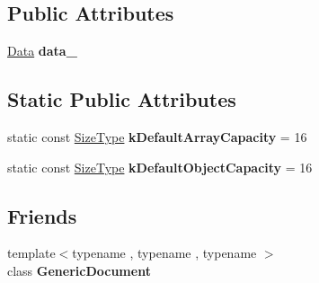 \subsection*{Public Attributes}
\begin{DoxyCompactItemize}
\item 
\mbox{\label{class_generic_value_aaf80f2c91d26fdde60b9edeeecd3509f}} 
\hyperlink{union_generic_value_1_1_data}{Data} {\bfseries data\+\_\+}
\end{DoxyCompactItemize}
\subsection*{Static Public Attributes}
\begin{DoxyCompactItemize}
\item 
\mbox{\label{class_generic_value_a188f57bdb1923c1fefe74baa995871a3}} 
static const \hyperlink{rapidjson_8h_a5ed6e6e67250fadbd041127e6386dcb5}{Size\+Type} {\bfseries k\+Default\+Array\+Capacity} = 16
\item 
\mbox{\label{class_generic_value_a284d018914629aed9a4bd97fe2dc5899}} 
static const \hyperlink{rapidjson_8h_a5ed6e6e67250fadbd041127e6386dcb5}{Size\+Type} {\bfseries k\+Default\+Object\+Capacity} = 16
\end{DoxyCompactItemize}
\subsection*{Friends}
\begin{DoxyCompactItemize}
\item 
\mbox{\label{class_generic_value_ab05bc9e52e201a2867ea5bac141ee1ae}} 
{\footnotesize template$<$typename , typename , typename $>$ }\\class {\bfseries Generic\+Document}
\end{DoxyCompactItemize}
